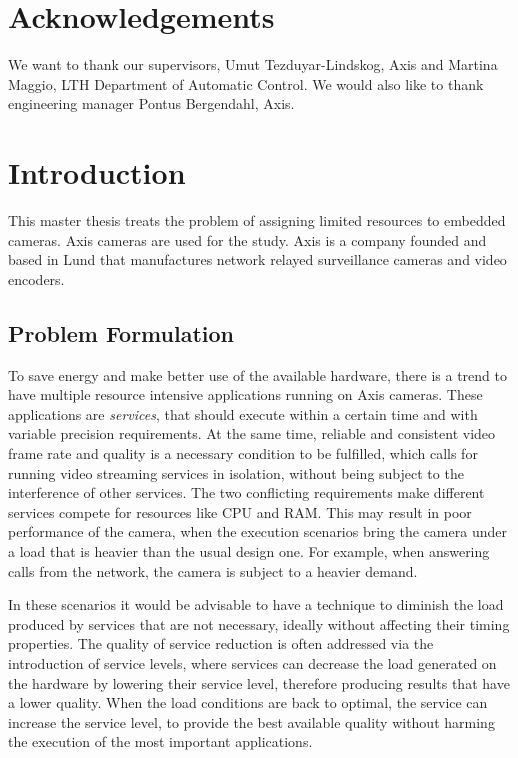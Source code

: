 \documentclass[nobiblatex]{LTHthesis}
\begin{document}
\chapter*{Acknowledgements}

We want to thank our supervisors, Umut Tezduyar-Lindskog, Axis and Martina 
Maggio, LTH Department of Automatic Control. We would also like to thank engineering 
manager Pontus Bergendahl, Axis.


\tableofcontents
\newpage

\setcounter{page}{1}

\chapter{Introduction}

This master thesis treats the problem of assigning limited resources to
embedded cameras. Axis cameras are used for the study. Axis is a company
founded and based in Lund that manufactures network relayed surveillance
cameras and video encoders.

\section{Problem Formulation}

To save energy and make better use of the available hardware, there is a
trend to have multiple resource intensive applications running on Axis
cameras. These applications are \emph{services}, that should execute within
a certain time and with variable precision requirements. At the same time,
reliable and consistent video frame rate and quality is a necessary
condition to be fulfilled, which calls for running video streaming
services in isolation, without being subject to the interference of
other services. The two conflicting requirements make different services 
compete for resources like CPU and RAM. This may result in poor performance 
of the camera, when the execution scenarios bring the camera under a load
that is heavier than the usual design one. For example, when answering calls
from the network, the camera is subject to a heavier demand. 

In these scenarios it would be advisable to have a technique to diminish
the load produced by services that are not necessary, ideally without
affecting their timing properties. The quality of service reduction is
often addressed via the introduction of service levels, where services can
decrease the load generated on the hardware by lowering their service level,
therefore producing results that have a lower quality. When the load
conditions are back to optimal, the service can increase the service level,
to provide the best available quality without harming the execution of the
most important applications.
\end{document}
